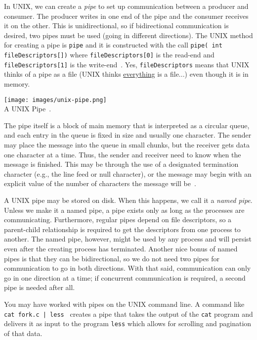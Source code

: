In UNIX, we can create a \textit{pipe} to set up communication between a producer and consumer. The producer writes in one end of the pipe and the consumer receives it on the other. This is unidirectional, so if bidirectional communication is desired, two pipes must be used (going in different directions). The UNIX method for creating a pipe is \texttt{pipe} and it is constructed with the call \texttt{pipe( int fileDescriptors[])} where \texttt{fileDescriptors[0]} is the read-end and \texttt{fileDescriptors[1]} is the write-end~\cite{osc}. Yes, \texttt{fileDescriptors} means that UNIX thinks of a pipe as a file (UNIX thinks \underline{everything} is a file...) even though it is in memory.

\begin{center}
	\texttt{[image: images/unix-pipe.png]}\\
	A UNIX Pipe~\cite{osc}.
\end{center}

The pipe itself is a block of main memory that is interpreted as a circular queue, and each entry in the queue is fixed in size and usually one character. The sender may place the message into the queue in small chunks, but the receiver gets data one character at a time. Thus, the sender and receiver need to know when the message is finished. This may be through the use of a designated termination character (e.g., the line feed or null character), or the message may begin with an explicit value of the number of characters the message will be~\cite{mte241}.

A UNIX pipe may be stored on disk. When this happens, we call it a \textit{named pipe}. Unless we make it a named pipe, a pipe exists only as long as the processes are communicating. Furthermore, regular pipes depend on file descriptors, so a parent-child relationship is required to get the descriptors from one process to another. The named pipe, however, might be used by any process and will persist even after the creating process has terminated. Another nice bonus of named pipes is that they can be bidirectional, so we do not need two pipes for communication to go in both directions. With that said, communication can only go in one direction at a time; if concurrent communication is required, a second pipe is needed after all.

You may have worked with pipes on the UNIX command line. A command like \texttt{ cat fork.c | less } creates a pipe that takes the output of the \texttt{cat} program and delivers it as input to the program \texttt{less} which allows for scrolling and pagination of that data.

